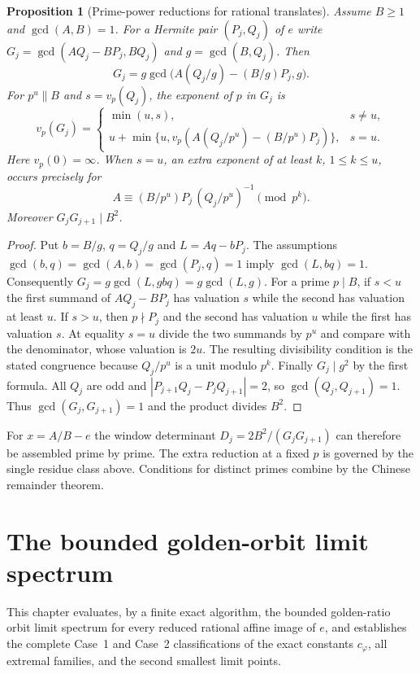 \documentclass[11pt]{amsart}
\newtheorem{proposition}[theorem]{Proposition}
\theoremstyle{definition}
\theoremstyle{remark}
\numberwithin{equation}{section}
\begin{document}
\begin{proposition}[Prime-power reductions for rational translates]\label{prop:rational-gcd-valuations}
Assume $B\ge1$ and $\gcd(A,B)=1$. For a Hermite pair $(P_j,Q_j)$ of $e$ write
$G_j=\gcd(AQ_j-BP_j,BQ_j)$ and $g=\gcd(B,Q_j)$. Then
\[
G_j=g\gcd\bigl(A(Q_j/g)-(B/g)P_j,g\bigr).
\]
For $p^u\parallel B$ and $s=v_p(Q_j)$, the exponent of $p$ in $G_j$ is
\[
v_p(G_j)=
\begin{cases}
\min(u,s), & s\ne u,\\
u+\min\{u,v_p(A(Q_j/p^u)-(B/p^u)P_j)\}, & s=u .
\end{cases}
\]
Here $v_p(0)=\infty$. When $s=u$, an extra exponent of at least $k$,
$1\le k\le u$, occurs precisely for
\[
 A\equiv (B/p^u)P_j\,(Q_j/p^u)^{-1}\pmod{p^k}.
\]
Moreover $G_jG_{j+1}\mid B^2$.
\end{proposition}
\begin{proof}
Put $b=B/g$, $q=Q_j/g$ and $L=Aq-bP_j$. The assumptions
$\gcd(b,q)=\gcd(A,b)=\gcd(P_j,q)=1$ imply $\gcd(L,bq)=1$.
Consequently $G_j=g\gcd(L,g b q)=g\gcd(L,g)$. For a prime $p\mid B$,
if $s<u$ the first summand of $AQ_j-BP_j$ has valuation $s$ while the
second has valuation at least $u$. If $s>u$, then $p\nmid P_j$ and the
second has valuation $u$ while the first has valuation $s$. At equality
$s=u$ divide the two summands by $p^u$ and compare with the denominator,
whose valuation is $2u$. The resulting divisibility condition is the
stated congruence because $Q_j/p^u$ is a unit modulo $p^k$.
Finally $G_j\mid g^2$ by the first formula. All $Q_j$ are odd and
$|P_{j+1}Q_j-P_jQ_{j+1}|=2$, so $\gcd(Q_j,Q_{j+1})=1$.
Thus $\gcd(G_j,G_{j+1})=1$ and the product divides $B^2$.
\end{proof}
For $x=A/B-e$ the window determinant $D_j=2B^2/(G_jG_{j+1})$
can therefore be assembled prime by prime. The extra reduction at a fixed
$p$ is governed by the single residue class above. Conditions for distinct
primes combine by the Chinese remainder theorem.

\section{The bounded golden-orbit limit spectrum}\label{sec:golden}

This chapter evaluates, by a finite exact algorithm, the bounded
golden-ratio orbit limit spectrum for every reduced rational
affine image of $e$, and establishes the complete Case~1 and
Case~2 classifications of the exact constants $c_\varphi$, all
extremal families, and the second smallest limit points.
\end{document}
